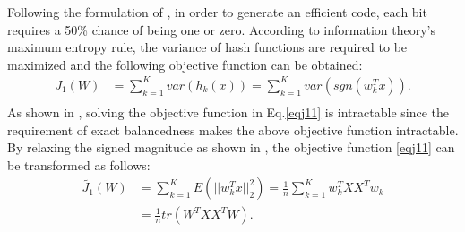 \documentclass{sig-alternate}
\begin{document}
Following the formulation of \cite{DBLP:WeissTF08-09}, in order to generate an efficient code, each bit requires a 50\% chance of being one or zero. According to information theory's maximum entropy rule, the variance of hash functions are required to be maximized and the following objective function can be obtained:
\begin{equation}\label{eqj11}
    \begin{split}
J_1(W) &=\sum_{k=1}^{K}var(h_k(x))=\sum_{k=1}^{K}var(sgn(w_k^Tx)).\\
    \end{split}
\end{equation}
As shown in \cite{DBLP:cvprGongL11-11}, solving the objective function in Eq.\ref{eqj11} is intractable since the requirement of exact balancedness makes the above objective function intractable. By relaxing the signed magnitude as shown in \cite{DBLP:WangKC10-16}, the objective function \eqref{eqj11} can be transformed as follows:
\begin{equation}\label{eqj12}
    \begin{split}
\tilde{J_1}(W) &=\sum_{k=1}^{K}E(||w_k^Tx||_2^2)=\frac{1}{n}\sum_{k=1}^{K}w_k^TXX^Tw_k\\
 &= \frac{1}{n}tr(W^TXX^TW).\\
    \end{split}
\end{equation}
\end{document}
